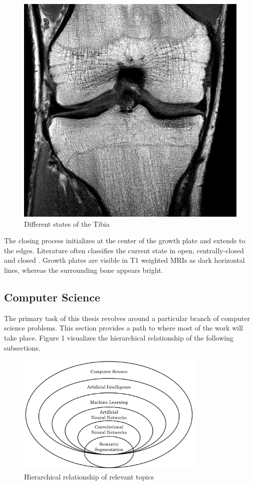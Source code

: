 \begin{figure}[!htb]
\endminipage\hfill
{}%
  \includegraphics[width=\linewidth]{imgs/closed-18y.jpg}
\endminipage
\caption{Different states of the Tibia}
\end{figure}

The closing process initializes at the center of the growth plate and extends to the edges. Literature often classifies the current state in open, centrally-closed and closed \cite{Mauer2015}. Growth plates are visible in T1 weighted MRIs as dark horizontal lines, whereas the surrounding bone appears bright.

\subsection{Computer Science}

The primary task of this thesis revolves around a particular branch of computer science problems. This section provides a path to where most of the work will take place. Figure 1 visualizes the hierarchical relationship of the following subsections.

\begin{figure}[H]
\centering
\par
\includegraphics[width=0.8\textwidth]{imgs/cs_hier.png}
\caption{Hierarchical relationship of relevant topics}
\par
\end{figure}

